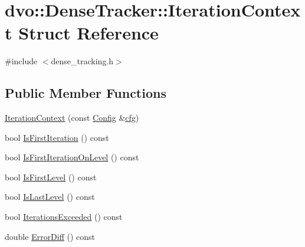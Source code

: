 \hypertarget{structdvo_1_1_dense_tracker_1_1_iteration_context}{}\section{dvo\+:\+:Dense\+Tracker\+:\+:Iteration\+Context Struct Reference}
\label{structdvo_1_1_dense_tracker_1_1_iteration_context}


{\ttfamily \#include $<$dense\+\_\+tracking.\+h$>$}

\subsection*{Public Member Functions}
\begin{DoxyCompactItemize}
\item 
\mbox{\hyperlink{structdvo_1_1_dense_tracker_1_1_iteration_context_ab2e12923bbbc9b540cf8139d3a4d3f33}{Iteration\+Context}} (const \mbox{\hyperlink{structdvo_1_1_dense_tracker_1_1_config}{Config}} \&\mbox{\hyperlink{structdvo_1_1_dense_tracker_1_1_iteration_context_a56d4fa3811b2b6d24243d2d0ea0d7348}{cfg}})
\item 
bool \mbox{\hyperlink{structdvo_1_1_dense_tracker_1_1_iteration_context_a67e450af240d213a8021d57bc11ac42a}{Is\+First\+Iteration}} () const
\item 
bool \mbox{\hyperlink{structdvo_1_1_dense_tracker_1_1_iteration_context_a419d0a3e80b785735eac4934fddf827f}{Is\+First\+Iteration\+On\+Level}} () const
\item 
bool \mbox{\hyperlink{structdvo_1_1_dense_tracker_1_1_iteration_context_a69730e1cd4e3c4bc183a181fe9026f40}{Is\+First\+Level}} () const
\item 
bool \mbox{\hyperlink{structdvo_1_1_dense_tracker_1_1_iteration_context_ac27dac99b037feb1e2bbce3b3315dd4a}{Is\+Last\+Level}} () const
\item 
bool \mbox{\hyperlink{structdvo_1_1_dense_tracker_1_1_iteration_context_aa15a70a3a1af2f73c07f7bc7eb933a9b}{Iterations\+Exceeded}} () const
\item 
double \mbox{\hyperlink{structdvo_1_1_dense_tracker_1_1_iteration_context_acc9cb928fcc0017d050d25393b4ed379}{Error\+Diff}} () const
\end{DoxyCompactItemize}
